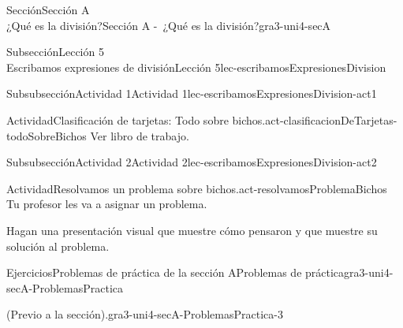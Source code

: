 \begin{sectionptx}{Sección}{{\Large Sección A\\}¿Qué es la división?}{}{Sección A -~¿Qué es la división?}{}{}{gra3-uni4-secA}
\begin{subsectionptx}{Subsección}{{\normalsize Lección 5\\[-0.05cm]}Escribamos expresiones de división}{}{Lección 5}{}{}{lec-escribamosExpresionesDivision}
\begin{subsubsectionptx}{Subsubsección}{Actividad 1}{}{Actividad 1}{}{}{lec-escribamosExpresionesDivision-act1}
\begin{activity}{Actividad}{Clasificación de tarjetas: Todo sobre bichos.}{act-clasificacionDeTarjetas-todoSobreBichos}%
Ver libro de trabajo.
\end{activity}%
%
\end{subsubsectionptx}
%
%
\typeout{************************************************}
\typeout{************************************************}
%
\begin{subsubsectionptx}{Subsubsección}{Actividad 2}{}{Actividad 2}{}{}{lec-escribamosExpresionesDivision-act2}
\begin{activity}{Actividad}{Resolvamos un problema sobre bichos.}{act-resolvamosProblemaBichos}%
Tu profesor les va a asignar un problema.%
\par
Hagan una presentación visual que muestre cómo pensaron y que muestre su solución al problema.%
\end{activity}%
\end{subsubsectionptx}
\end{subsectionptx}
%
%
\typeout{************************************************}
\typeout{************************************************}
%
\begin{exercises-subsection}{Ejercicios}{Problemas de práctica de la sección A}{}{Problemas de práctica}{}{}{gra3-uni4-secA-ProblemasPractica}
\begin{divisionexercise}{1}{(Previo a la sección).}{}{gra3-uni4-secA-ProblemasPractica-3}%
\begin{sidebyside}{2}{0}{0}{0}%
\begin{sbspanel}{0.3}%

\end{sbspanel}
\end{sidebyside}
\end{divisionexercise}
\end{exercises-subsection}
\end{sectionptx}
